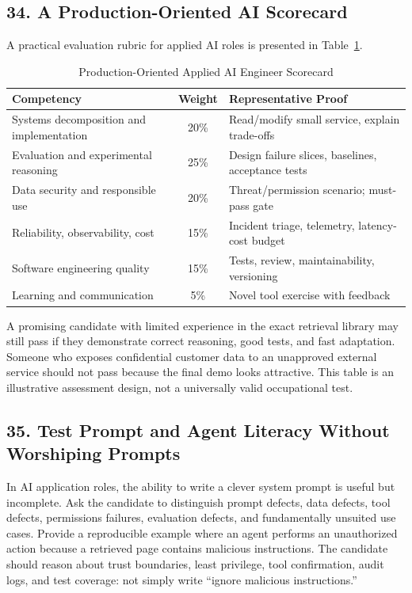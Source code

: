 \subsection*{34. A Production-Oriented AI Scorecard}

A practical evaluation rubric for applied AI roles is presented in Table~\ref{tab:ai_engineer_scorecard}.

\begin{table}[htbp]
\centering
\small
\caption{Production-Oriented Applied AI Engineer Scorecard}
\label{tab:ai_engineer_scorecard}
\begin{tabularx}{\columnwidth}{p{3.2cm} c X}
\toprule
\textbf{Competency} & \textbf{Weight} & \textbf{Representative Proof} \\
\midrule
Systems decomposition and implementation & 20\% & Read/modify small service, explain trade-offs \\
Evaluation and experimental reasoning & 25\% & Design failure slices, baselines, acceptance tests \\
Data security and responsible use & 20\% & Threat/permission scenario; must-pass gate \\
Reliability, observability, cost & 15\% & Incident triage, telemetry, latency-cost budget \\
Software engineering quality & 15\% & Tests, review, maintainability, versioning \\
Learning and communication & 5\% & Novel tool exercise with feedback \\
\bottomrule
\end{tabularx}
\end{table}

A promising candidate with limited experience in the exact retrieval library may still pass if they demonstrate correct reasoning, good tests, and fast adaptation. Someone who exposes confidential customer data to an unapproved external service should not pass because the final demo looks attractive. This table is an illustrative assessment design, not a universally valid occupational test.

\subsection*{35. Test Prompt and Agent Literacy Without Worshiping Prompts}

In AI application roles, the ability to write a clever system prompt is useful but incomplete. Ask the candidate to distinguish prompt defects, data defects, tool defects, permissions failures, evaluation defects, and fundamentally unsuited use cases. Provide a reproducible example where an agent performs an unauthorized action because a retrieved page contains malicious instructions. The candidate should reason about trust boundaries, least privilege, tool confirmation, audit logs, and test coverage: not simply write ``ignore malicious instructions.''

